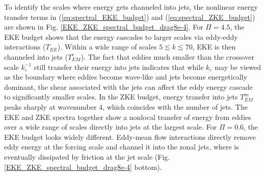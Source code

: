 \documentclass{jfm}
\begin{document}
To identify the scales where energy gets channeled into jets, the nonlinear 
energy transfer terms in (\ref{eq:spectral_EKE_budget}) and 
(\ref{eq:spectral_ZKE_budget}) are shown in Fig. \ref{EKE_ZKE_spectral_budget_drag8e-4}.
For $\Pi=4.5$, the EKE budget shows that the energy cascades to larger scales
via eddy-eddy interactions ($T_{EE}$). Within a wide range 
of scales $5\apprle k\apprle70$, EKE is then channeled into jets 
($T^e_{EM}$). The fact that eddies much smaller
than the crossover scale $k_{\varepsilon}^{-1}$ still transfer their
energy into jets indicates that while $k_{\varepsilon}$ may be viewed as the boundary where
eddies become wave-like and jets become energetically dominant, the shear
associated with the jets can affect the eddy energy cascade to significantly smaller scales.
In the ZKE budget, energy transfer into jets $T_{EM}^{m}$ peaks
sharply at wavenumber 4, which coincides with the number of jets. The
EKE and ZKE spectra together show a nonlocal transfer of energy from
eddies over a wide range of scales directly into jets at the largest scale.
For $\Pi=0.6$, the EKE budget looks widely different.%
Eddy-mean flow interactions directly remove eddy energy at the forcing scale and   
channel it into the zonal jets, where is eventually dissipated by friction
at the jet scale (Fig. \ref{EKE_ZKE_spectral_budget_drag8e-4} bottom). 

\end{document}
